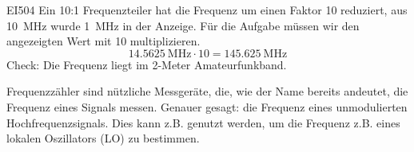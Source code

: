 \begin{sol}{EI504}
 Ein 10:1 Frequenzteiler hat die Frequenz um einen Faktor 10 reduziert, aus \SI{10}{\mega\hertz} wurde \SI{1}{\mega\hertz} in der Anzeige.
 Für die Aufgabe müssen wir den angezeigten Wert mit 10 multiplizieren.
 $$ \SI{14,5625}{\mega\hertz} \cdot 10 = \SI{145,625}{\mega\hertz}$$
 Check: Die Frequenz liegt im 2-Meter Amateurfunkband.
\end{sol}  


\begin{ohmchapter}
Frequenzzähler sind nützliche Messgeräte, die, wie der Name bereits andeutet, die Frequenz eines Signals messen. Genauer gesagt: die Frequenz eines unmodulierten Hochfrequenzsignals.  Dies kann z.B. genutzt werden, um die Frequenz z.B. eines lokalen Oszillators (LO) zu bestimmen.
\end{ohmchapter}  

